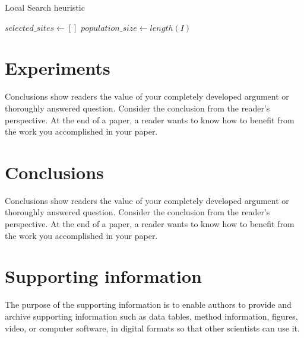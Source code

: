 \documentclass[11pt, a4paper]{article}
\begin{document}
\begin{algorithm}
	\caption{Local Search heuristic}
	\SetAlgoLined

	\KwResult{}
	$selected\_sites \gets []$\;
	$population\_size \gets length(I)$\;


\end{algorithm}

\section{Experiments}\label{sec:conc} 
Conclusions show readers the value of your completely developed argument or thoroughly answered question. Consider the conclusion from the reader's perspective. At the end of a paper, a reader wants to know how to benefit from the work you accomplished in your paper. 

\section{Conclusions}
Conclusions show readers the value of your completely developed argument or thoroughly answered question. Consider the conclusion from the reader's perspective. At the end of a paper, a reader wants to know how to benefit from the work you accomplished in your paper. 

\appendix
\section{Supporting information}
The purpose of the supporting information is to enable authors to provide and archive supporting information such as data tables, method information, figures, video, or computer software, in digital formats so that other scientists can use it.

\small \singlespacing
 

\end{document}
